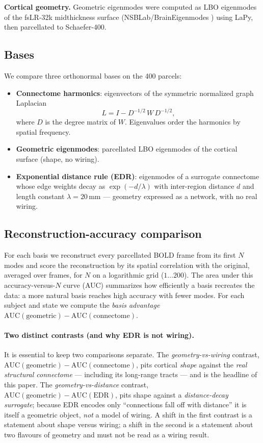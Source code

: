 \documentclass[10pt,a4paper]{article}
\begin{document}
\textbf{Cortical geometry.} Geometric eigenmodes were computed as LBO eigenmodes
of the fsLR-32k midthickness surface (NSBLab/BrainEigenmodes \cite{pang2023})
using LaPy, then parcellated to Schaefer-400.

\subsection{Bases}
We compare three orthonormal bases on the 400 parcels:
\begin{itemize}
  \item \textbf{Connectome harmonics}: eigenvectors of the symmetric normalized
  graph Laplacian
  \begin{equation}
    L = I - D^{-1/2}\,W\,D^{-1/2},
  \end{equation}
  where $D$ is the degree matrix of $W$. Eigenvalues order the harmonics by
  spatial frequency.
  \item \textbf{Geometric eigenmodes}: parcellated LBO eigenmodes of the cortical
  surface (shape, no wiring).
  \item \textbf{Exponential distance rule (EDR)}: eigenmodes of a surrogate
  connectome whose edge weights decay as $\exp(-d/\lambda)$ with inter-region
  distance $d$ and length constant $\lambda=20$\,mm --- geometry expressed as a
  network, with no real wiring.
\end{itemize}

\subsection{Reconstruction-accuracy comparison}
For each basis we reconstruct every parcellated BOLD frame from its first $N$
modes and score the reconstruction by its spatial correlation with the original,
averaged over frames, for $N$ on a logarithmic grid ($1\ldots200$). The area
under this accuracy-versus-$N$ curve (AUC) summarizes how efficiently a basis
recreates the data: a more natural basis reaches high accuracy with fewer modes.
For each subject and state we compute the \emph{basis advantage}
$\mathrm{AUC}(\text{geometric})-\mathrm{AUC}(\text{connectome})$.

\paragraph{Two distinct contrasts (and why EDR is not wiring).} It is essential
to keep two comparisons separate. The \emph{geometry-vs-wiring} contrast,
$\mathrm{AUC}(\text{geometric})-\mathrm{AUC}(\text{connectome})$, pits cortical
\emph{shape} against the \emph{real structural connectome} --- including its
long-range tracts --- and is the headline of this paper. The
\emph{geometry-vs-distance} contrast,
$\mathrm{AUC}(\text{geometric})-\mathrm{AUC}(\text{EDR})$, pits shape against a
\emph{distance-decay surrogate}; because EDR encodes only ``connections fall off
with distance'' it is itself a geometric object, \emph{not} a model of wiring.
A shift in the first contrast is a statement about shape versus wiring; a shift
in the second is a statement about two flavours of geometry and must not be read
as a wiring result.
\end{document}
